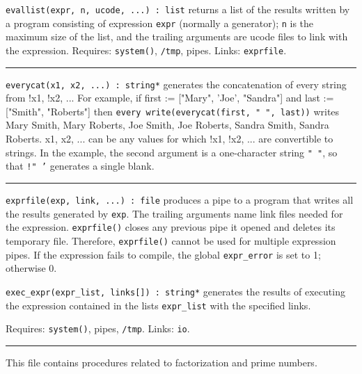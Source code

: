 \texttt{evallist(expr, n, ucode, ...) : list} 
returns a list of the results written by a program consisting of expression
\texttt{expr} (normally a
generator); \texttt{n} is the maximum size of the list, and the
trailing arguments are ucode files to link with the expression.
Requires: \texttt{system()}, \texttt{/tmp}, pipes. Links:
\texttt{exprfile}. 

\vspace{0.25cm}\hrule{}

\texttt{everycat(x1, x2, ...) : string*} generates the concatenation of
every string from !x1, !x2, ... For example, if first :=
["Mary", 'Joe',
"Sandra"] and last :=
["Smith",
"Roberts"] then \texttt{every
write(everycat(first, " ", last))} writes
Mary Smith, Mary Roberts, Joe Smith, Joe Roberts, Sandra Smith, Sandra
Roberts. x1, x2, ... can be any values for which !x1, !x2, ... are
convertible to strings. In the example, the second
argument is a one-character string \texttt{"
"}, so that \texttt{!" '}
generates a single blank. 

\vspace{0.25cm}\hrule{}

\texttt{exprfile(exp, link, ...) : file} produces a pipe to a program
that writes all the results generated by \texttt{exp}. The trailing
arguments name link files needed for the expression.
\texttt{exprfile()} closes any previous pipe it opened and deletes its
temporary file. Therefore, \texttt{exprfile()} cannot be used for
multiple expression pipes. If the expression fails to compile, the
global \texttt{expr\_error} is set to 1; otherwise 0. 

\texttt{exec\_expr(expr\_list, links[]) : string*} generates the results
of executing the expression contained in the lists \texttt{expr\_list}
with the specified links.

Requires: \texttt{system()}, pipes, \texttt{/tmp}. Links: \texttt{io}.


\vspace{0.25cm}\hrule{}

This file contains procedures related to factorization and prime
numbers.


